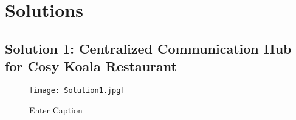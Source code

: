 \documentclass{article}
\begin{document}



\clearpage
\section{Solutions}
\subsection{Solution 1: Centralized Communication Hub for Cosy Koala Restaurant}

\begin{figure}
    \centering
    \texttt{[image: Solution1.jpg]}
    \caption{Enter Caption}
    \label{fig:enter-label}
\end{figure}
\end{document}
